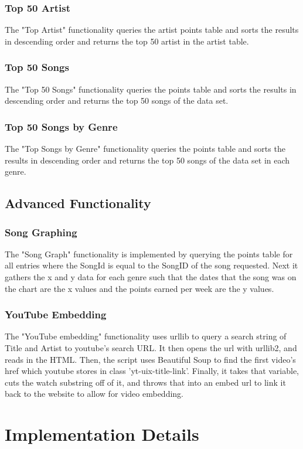 \documentclass{article}
\begin{document}
\subsubsection*{Top 50 Artist}
The "Top Artist" functionality queries the artist points table and sorts the results in descending order and returns the top 50 artist in the artist table. 
\subsubsection*{Top 50 Songs}
The "Top 50 Songs" functionality queries the points table and sorts the results in descending order and returns the top 50 songs of the data set.
\subsubsection*{Top 50 Songs by Genre}
The "Top Songs by Genre" functionality queries the points table and sorts the results in descending order and returns the top 50 songs of the data set in each genre.    
\subsection*{Advanced Functionality}
\subsubsection*{Song Graphing}
The "Song Graph" functionality is implemented by querying the points table for all entries where the SongId is equal to the SongID of the song requested. Next it gathers the x and y data for each genre such that the dates that the song was on the chart are the x values and the points earned per week are the y values.
\subsubsection*{YouTube Embedding}
The "YouTube embedding" functionality uses urllib to query a search string of Title and Artist to youtube's search URL.
It then opens the url with urllib2, and reads in the HTML.
Then, the script uses Beautiful Soup to find the first video's href which youtube stores in class 'yt-uix-title-link'.
Finally, it takes that variable, cuts the watch substring off of it, and throws that into an embed url to link it back to the website to allow for video embedding.
\section*{Implementation Details}
\end{document}
